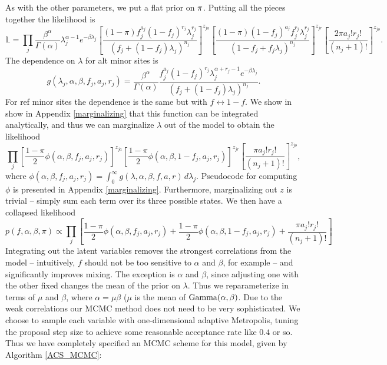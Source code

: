 \documentclass[nofootinbib,amssymb,amsmath]{revtex4}
\begin{document}
As with the other parameters, we put a flat prior on ${\rm \pi}$.  Putting all the pieces together the likelihood is
\begin{equation}
\mathbb{L} =\prod_j \frac{\beta^\alpha}{\Gamma(\alpha)} \lambda_j^{\alpha - 1} e^{-\beta \lambda_j}
\left[ \frac{(1-\pi) f_j^{a_j} (1 - f_j)^{r_j} \lambda_j^{r_j}}{ \left( f_j + (1-f_j) \lambda_j \right)^{n_j}} \right]^{z_{ja}}   
\left[ \frac{(1-\pi) (1-f_j)^{a_j} f_j^{r_j} \lambda_j^{r_j}}{ \left( 1 - f_j + f_j \lambda_j \right)^{n_j}} \right]^{z_{jr}}   
\left[ \frac{2 \pi a_j! r_j!}{(n_j + 1)!} \right]^{z_{jo}}.
\label{likelihood}
\end{equation}
%
The dependence on $\lambda$ for alt minor sites is
%
\begin{equation}
g(\lambda_j, \alpha, \beta, f_j, a_j, r_j) = \frac{\beta^\alpha}{\Gamma(\alpha)}  \frac{ f_j^{a_j} (1 - f_j)^{r_j}  \lambda_j^{\alpha + r_j - 1} e^{-\beta \lambda_j}}{ \left( f_j + (1-f_j) \lambda_j \right)^{n_j}}.
\end{equation}
For ref minor sites the dependence is the same but with $f \leftrightarrow 1 - f$.  We show in show in Appendix \ref{marginalizing} that this function can be integrated analytically, and thus we can marginalize $\lambda$ out of the model to obtain the likelihood
%
\begin{equation}
\prod_j 
\left[ \frac{1-\pi}{2} \phi(\alpha, \beta, f_j, a_j, r_j)  \right]^{z_{ja}}   
\left[ \frac{1-\pi}{2} \phi(\alpha, \beta, 1 - f_j, a_j, r_j)  \right]^{z_{jr}}   
\left[ \frac{ \pi a_j! r_j!}{(n_j + 1)!}  \right]^{z_{jo}},
\label{marginalized}
\end{equation}
%
where $\phi(\alpha, \beta, f_j, a_j, r_j) = \int_0^\infty g(\lambda, \alpha, \beta, f, a, r) \, d \lambda_j$.  Pseudocode for computing $\phi$ is presented in Appendix \ref{marginalizing}.  Furthermore, marginalizing out $z$ is trivial -- simply sum each term over its three possible states.  We then have a collapsed likelihood
%
\begin{equation}
p(f,\alpha, \beta, \pi) \propto \prod_j 
\left[    \frac{1-\pi}{2} \phi(\alpha, \beta, f_j, a_j, r_j)  +
\frac{1-\pi}{2} \phi(\alpha, \beta, 1 - f_j, a_j, r_j)  +
 \frac{ \pi a_j! r_j!}{(n_j + 1)!}    \right]
 \label{collapsed}
\end{equation}
%
Integrating out the latent variables removes the strongest correlations from the model -- intuitively, $f$ should not be too sensitive to $\alpha$ and $\beta$, for example -- and significantly improves mixing.  The exception is $\alpha$ and $\beta$, since adjusting one with the other fixed changes the mean of the prior on $\lambda$.  Thus we reparameterize in terms of $\mu$ and $\beta$, where $\alpha = \mu \beta$ ($\mu$ is the mean of ${\rm Gamma}(\alpha, \beta)$.  Due to the weak correlations our MCMC method does not need to be very sophisticated.  We choose to sample each variable with one-dimensional adaptive Metropolis, tuning the proposal step size to achieve some reasonable acceptance rate like $0.4$ or so.  Thus we have completely specified an MCMC scheme for this model, given by Algorithm \ref{ACS_MCMC}:
\end{document}
